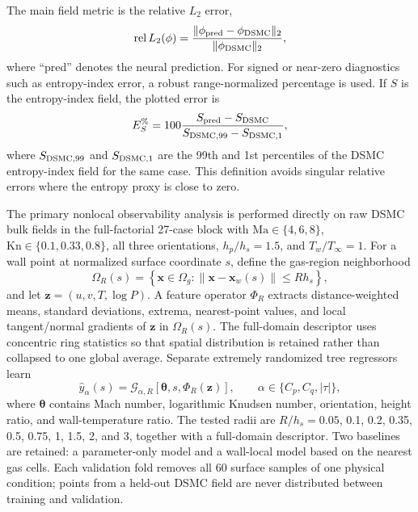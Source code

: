 \documentclass[aip,pof,preprint,floatfix,amsmath,amssymb]{revtex4-2}
\newcommand{\Kn}{\mathrm{Kn}}
\newcommand{\Ma}{\mathrm{Ma}}
\newcommand{\relLtwo}{\mathrm{rel}\,L_2}
\begin{document}
The main field metric is the relative $L_2$ error,
\begin{equation}
 \relLtwo(\phi)=\frac{\|\phi_{\rm pred}-\phi_{\rm DSMC}\|_2}{\|\phi_{\rm DSMC}\|_2},
\end{equation}
where ``pred'' denotes the neural prediction. For signed or near-zero diagnostics such as entropy-index error, a robust range-normalized percentage is used. If $S$ is the entropy-index field, the plotted error is
\begin{equation}
 E_S^{\%}=100\frac{S_{\rm pred}-S_{\rm DSMC}}{S_{{\rm DSMC},99}-S_{{\rm DSMC},1}},
\end{equation}
where $S_{{\rm DSMC},99}$ and $S_{{\rm DSMC},1}$ are the 99th and 1st percentiles of the DSMC entropy-index field for the same case. This definition avoids singular relative errors where the entropy proxy is close to zero.


The primary nonlocal observability analysis is performed directly on raw DSMC bulk fields in the full-factorial 27-case block with $\Ma\in\{4,6,8\}$, $\Kn\in\{0.1,0.33,0.8\}$, all three orientations, $h_p/h_s=1.5$, and $T_w/T_\infty=1$. For a wall point at normalized surface coordinate $s$, define the gas-region neighborhood
\begin{equation}
 \Omega_R(s)=\left\{\bm{x}\in\Omega_g:\|\bm{x}-\bm{x}_w(s)\|\le R h_s\right\},
\end{equation}
and let $\bm{z}=(u,v,T,\log P)$. A feature operator $\Phi_R$ extracts distance-weighted means, standard deviations, extrema, nearest-point values, and local tangent/normal gradients of $\bm{z}$ in $\Omega_R(s)$. The full-domain descriptor uses concentric ring statistics so that spatial distribution is retained rather than collapsed to one global average. Separate extremely randomized tree regressors\cite{Geurts2006} learn
\begin{equation}
 \widehat{y}_{\alpha}(s)=\mathcal{G}_{\alpha,R}\!\left[\bm{\theta},s,\Phi_R(\bm{z})\right],
 \qquad \alpha\in\{C_p,C_q,|\tau|\},
\end{equation}
where $\bm{\theta}$ contains Mach number, logarithmic Knudsen number, orientation, height ratio, and wall-temperature ratio. The tested radii are $R/h_s=0.05$, 0.1, 0.2, 0.35, 0.5, 0.75, 1, 1.5, 2, and 3, together with a full-domain descriptor. Two baselines are retained: a parameter-only model and a wall-local model based on the nearest gas cells. Each validation fold removes all 60 surface samples of one physical condition; points from a held-out DSMC field are never distributed between training and validation.
\end{document}
